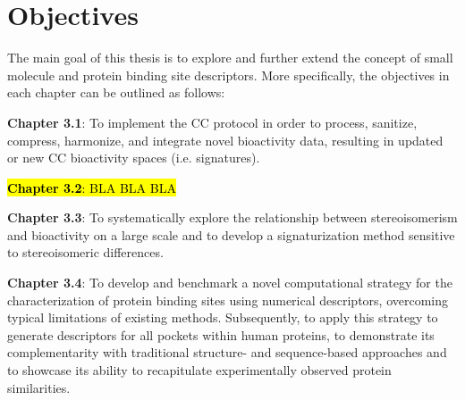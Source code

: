 \chapter{Objectives}
\label{objectives}
\clearpage

The main goal of this thesis is to explore and further extend the concept of small molecule and protein binding site descriptors. More specifically, the objectives in each chapter can be outlined as follows:

\textbf{Chapter 3.1}: To implement the CC protocol in order to process, sanitize, compress, harmonize, and integrate novel bioactivity data, resulting in updated or new CC bioactivity spaces (i.e. signatures). 

\hl{\textbf{Chapter 3.2}: BLA BLA BLA}

\textbf{Chapter 3.3}: To systematically explore the relationship between stereoisomerism and bioactivity on a large scale and to develop a signaturization method sensitive to stereoisomeric differences. 

\textbf{Chapter 3.4}: To develop and benchmark a novel computational strategy for the characterization of protein binding sites using numerical descriptors, overcoming typical limitations of existing methods. Subsequently, to apply this strategy to generate descriptors for all pockets within human proteins, to demonstrate its complementarity with traditional structure- and sequence-based approaches and to showcase its ability to recapitulate experimentally observed protein similarities.